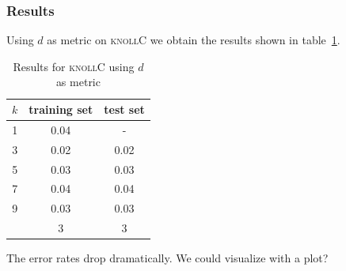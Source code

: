 \documentclass{article}
\newcommand{\knollC}{\textsc{knollC}\xspace}
\begin{document}
\subsubsection{Results}
Using $d$ as metric on \knollC we obtain the results shown in table~\ref{tbl:knollCd}.

\begin{table}[h!]
  \centering
  \begin{tabular}{c | c|c }
    $k$ & training set & test set\\ \hline
    1 & 0.04 &   - \\
    3 & 0.02 & 0.02\\
    5 & 0.03 & 0.03\\ 
    7 & 0.04 & 0.04\\ 
    9 & 0.03 & 0.03 \\\hline\hline
    \hfill & 3 & 3
  \end{tabular}
  \caption{Results for \knollC using $d$ as metric}
  \label{tbl:knollCd}
\end{table}

The error rates drop dramatically. We could visualize with a plot?
\end{document}

